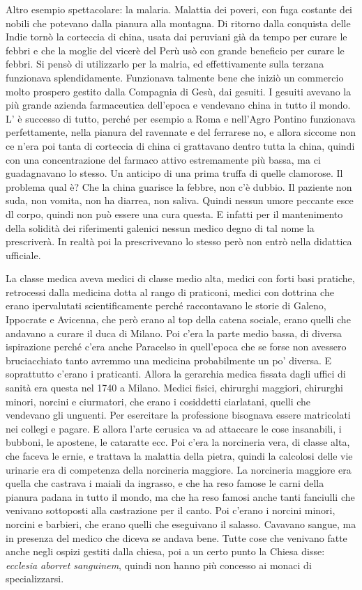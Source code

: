 Altro esempio spettacolare: la malaria. Malattia dei poveri, con fuga
costante dei nobili che potevano dalla pianura alla montagna. Di ritorno
dalla conquista delle Indie tornò la corteccia di china, usata dai
peruviani già da tempo per curare le febbri e che la moglie del vicerè
del Perù usò con grande beneficio per curare le febbri. Si pensò di
utilizzarlo per la malria, ed effettivamente sulla terzana funzionava
splendidamente. Funzionava talmente bene che iniziò un commercio molto
prospero gestito dalla Compagnia di Gesù, dai gesuiti. I gesuiti avevano
la più grande azienda farmaceutica dell'epoca e vendevano china in tutto
il mondo. L' è successo di tutto, perché per esempio a Roma e nell'Agro
Pontino funzionava perfettamente, nella pianura del ravennate e del
ferrarese no, e allora siccome non ce n'era poi tanta di corteccia di
china ci grattavano dentro tutta la china, quindi con una concentrazione
del farmaco attivo estremamente più bassa, ma ci guadagnavano lo stesso.
Un anticipo di una prima truffa di quelle clamorose. Il problema qual è?
Che la china guarisce la febbre, non c'è dubbio. Il paziente non suda,
non vomita, non ha diarrea, non saliva. Quindi nessun umore peccante
esce dl corpo, quindi non può essere una cura questa. E infatti per il
mantenimento della solidità dei riferimenti galenici nessun medico degno
di tal nome la prescriverà. In realtà poi la prescrivevano lo stesso
però non entrò nella didattica ufficiale.

La classe medica aveva medici di classe medio alta, medici con forti
basi pratiche, retrocessi dalla medicina dotta al rango di praticoni,
medici con dottrina che erano ipervalutati scientificamente perché
raccontavano le storie di Galeno, Ippocrate e Avicenna, che però erano
al top della catena sociale, erano quelli che andavano a curare il duca
di Milano. Poi c'era la parte medio bassa, di diversa ispirazione perché
c'era anche Paracelso in quell'epoca che se forse non avessero
bruciacchiato tanto avremmo una medicina probabilmente un po' diversa. E
soprattutto c'erano i praticanti. Allora la gerarchia medica fissata
dagli uffici di sanità era questa nel 1740 a Milano. Medici fisici,
chirurghi maggiori, chirurghi minori, norcini e ciurmatori, che erano i
cosiddetti ciarlatani, quelli che vendevano gli unguenti. Per esercitare
la professione bisognava essere matricolati nei collegi e pagare. E
allora l'arte cerusica va ad attaccare le cose insanabili, i bubboni, le
apostene, le cataratte ecc. Poi c'era la norcineria vera, di classe
alta, che faceva le ernie, e trattava la malattia della pietra, quindi
la calcolosi delle vie urinarie era di competenza della norcineria
maggiore. La norcineria maggiore era quella che castrava i maiali da
ingrasso, e che ha reso famose le carni della pianura padana in tutto il
mondo, ma che ha reso famosi anche tanti fanciulli che venivano
sottoposti alla castrazione per il canto. Poi c'erano i norcini minori,
norcini e barbieri, che erano quelli che eseguivano il salasso. Cavavano
sangue, ma in presenza del medico che diceva se andava bene. Tutte cose
che venivano fatte anche negli ospizi gestiti dalla chiesa, poi a un
certo punto la Chiesa disse: \emph{ecclesia aborret sanguinem}, quindi
non hanno più concesso ai monaci di specializzarsi.

